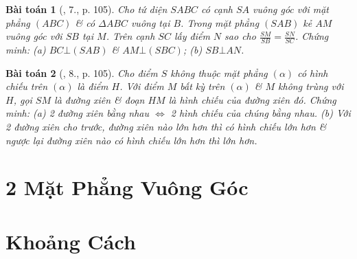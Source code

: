 \documentclass{article}
\numberwithin{equation}{section}
\newtheorem{baitoan}{Bài toán}
\begin{document}
\begin{baitoan}[\cite{SGK_Toan_11_hinh_hoc_co_ban}, 7., p. 105]
	Cho tứ diện $SABC$ có cạnh $SA$ vuông góc với mặt phẳng $(ABC)$ \& có $\Delta ABC$ vuông tại $B$. Trong mặt phẳng $(SAB)$ kẻ $AM$ vuông góc với $SB$ tại $M$. Trên cạnh $SC$ lấy điểm $N$ sao cho $\frac{SM}{SB} = \frac{SN}{SC}$. Chứng minh: (a) $BC\bot(SAB)$ \& $AM\bot(SBC)$; (b) $SB\bot AN$.
\end{baitoan}

\begin{baitoan}[\cite{SGK_Toan_11_hinh_hoc_co_ban}, 8., p. 105]
	Cho điểm $S$ không thuộc mặt phẳng $(\alpha)$ có hình chiếu trên $(\alpha)$ là điểm $H$. Với điểm $M$ bất kỳ trên $(\alpha)$ \& $M$ không trùng với $H$, gọi $SM$ là đường xiên \& đoạn $HM$ là hình chiếu của đường xiên đó. Chứng minh: (a) 2 đường xiên bằng nhau $\Leftrightarrow$ 2 hình chiếu của chúng bằng nhau. (b) Với 2 đường xiên cho trước, đường xiên nào lớn hơn thì có hình chiếu lớn hơn \& ngược lại đường xiên nào có hình chiếu lớn hơn thì lớn hơn.
\end{baitoan}


\section{2 Mặt Phẳng Vuông Góc}


\section{Khoảng Cách}


\printbibliography[heading=bibintoc]
	
\end{document}
